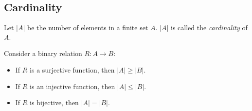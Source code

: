 \documentclass[../main.tex]{subfiles}
\begin{document}
\subsection{Cardinality}
Let $\lvert A \rvert$ be the number of elements in a finite set $A$. $\lvert A \rvert$ is called the \textit{cardinality} of $A$.

Consider a binary relation $R : A \to B$:

\begin{itemize}
  \item If $R$ is a surjective function, then $\lvert A \rvert \geq \lvert B \rvert$.
  \item If $R$ is an injective function, then $\lvert A \rvert \leq \lvert B \rvert$.
  \item If $R$ is bijective, then $\lvert A \rvert = \lvert B \rvert$.
\end{itemize}
\end{document}
